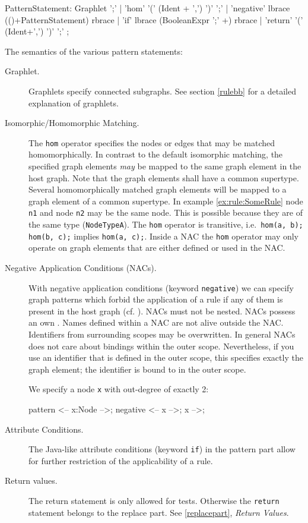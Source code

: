 \begin{rail}  
  PatternStatement: 
    Graphlet ';' |
    'hom' '(' (Ident + ',') ')' ';' |
    'negative' lbrace (()+PatternStatement) rbrace |
    'if' lbrace (BooleanExpr ';' +) rbrace |
    'return' '(' (Ident+',') ')' ';' ;
\end{rail}
The semantics of the various pattern statements:
\begin{description}
  \item[Graphlet.] Graphlets specify connected subgraphs. See section \ref{rulebb} for a detailed explanation of graphlets. 
  \item[Isomorphic/Homomorphic Matching.] The \texttt{hom} operator specifies the nodes or edges that may be matched homomorphically. 
  In contrast to the default isomorphic matching, the specified graph elements \emph{may} be mapped to the same graph element in the host graph. Note that the graph elements shall have a common supertype. 
  Several homomorphically matched graph elements will be mapped to a graph element of a common supertype.
  In example \ref{ex:rule:SomeRule} node \texttt{n1} and node \texttt{n2} may be the same node. This is possible because they are of the same type (\texttt{NodeTypeA}).
  The \texttt{hom} operator is transitive, i.e.\ \texttt{hom(a, b); hom(b, c);} implies \texttt{hom(a, c);}. 
  Inside a NAC the \texttt{hom} operator may only operate on graph elements that are either defined or used in the NAC.
  \item[Negative Application Conditions (NACs).] With negative application conditions (keyword \texttt{negative}) we can specify graph patterns which forbid the application of a rule if any of them is present in the host graph (cf. \cite{adam}). 
  NACs must not be nested.
  NACs possess an own . 
  Names defined within a NAC are not alive outside the NAC. 
  Identifiers from surrounding scopes may be overwritten.
  In general NACs does not care about bindings within the outer scope. 
  Nevertheless, if you use an identifier that is defined in the outer scope, this specifies exactly the graph element; the identifier is bound to in the outer scope.
  \begin{example}
    We specify a node \texttt{x} with out-degree of exactly 2:
    \begin{grgen}
pattern {
  <-- x:Node -->;
  negative {
    <-- x -->;
    x -->;
  }
}
    \end{grgen}
  \end{example}
  \item[Attribute Conditions.] The Java-like attribute conditions (keyword \texttt{if}) in the pattern part allow for further restriction of the applicability of a rule.
  \item[Return values.] The return statement is only allowed for tests. Otherwise the \texttt{return} statement belongs to the replace part. See \ref{replacepart}, \emph{Return Values}.
\end{description}
